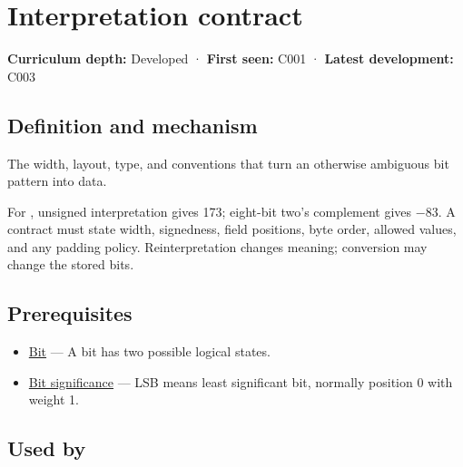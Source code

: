 \hypertarget{appendix-f414bd4ed05c}{}\label{referencestart:appendix-f414bd4ed05c}
\section{Interpretation contract}\label{appendix-f414bd4ed05c-interpretation-contract}

\hypertarget{appendix-f414bd4ed05c-interpretation-contract}{}

\textbf{Curriculum depth:} Developed · \textbf{First seen:} C001 · \textbf{Latest development:} C003

\begin{allmightroledefinition}

\subsection{Definition and mechanism}\label{appendix-f414bd4ed05c-definition-and-mechanism}

\hypertarget{appendix-f414bd4ed05c-definition-and-mechanism}{}

The width, layout, type, and conventions that turn an otherwise ambiguous bit pattern into data.

\end{allmightroledefinition}

For , unsigned interpretation gives 173; eight-bit two's complement gives −83. A contract must state width, signedness, field positions, byte order, allowed values, and any padding policy. Reinterpretation changes meaning; conversion may change the stored bits.

\subsection{Prerequisites}\label{appendix-f414bd4ed05c-prerequisites}

\hypertarget{appendix-f414bd4ed05c-prerequisites}{}

\begin{itemize}
\tightlist
\item
  \hyperref[appendix-ddbb69998a2e]{Bit} --- A bit has two possible logical states.
\item
  \hyperref[appendix-280445746493]{Bit significance} --- LSB means least significant bit, normally position 0 with weight 1.
\end{itemize}

\subsection{Used by}\label{appendix-f414bd4ed05c-used-by}

